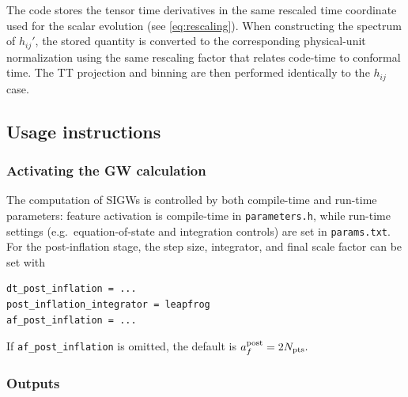 \documentclass[aps, nofootinbib,superscriptaddress, preprintnumbers, longbibliography]{article}
\begin{document}
The code stores the tensor time derivatives in the same rescaled time coordinate used for the scalar evolution (see \cref{eq:rescaling}). When constructing the spectrum of $h_{ij}'$, the stored quantity is converted to the corresponding physical-unit normalization using the same rescaling factor that relates code-time to conformal time. The TT projection and binning are then performed identically to the $h_{ij}$ case.


\subsection{Usage instructions}

\subsubsection*{Activating the GW calculation}

The computation of SIGWs is controlled by both compile-time and run-time parameters: feature activation is compile-time in \texttt{parameters.h}, while run-time settings (e.g.\ equation-of-state and integration controls) are set in \texttt{params.txt}. For the post-inflation stage, the step size, integrator, and final scale factor can be set with
\begin{lstlisting}[language=bash,numbers=none]
dt_post_inflation = ...
post_inflation_integrator = leapfrog
af_post_inflation = ...
\end{lstlisting}
If \texttt{af\_post\_inflation} is omitted, the default is
$
a_f^{\rm post} = 2N_{\rm pts}.
$

\subsubsection*{Outputs}
\end{document}

